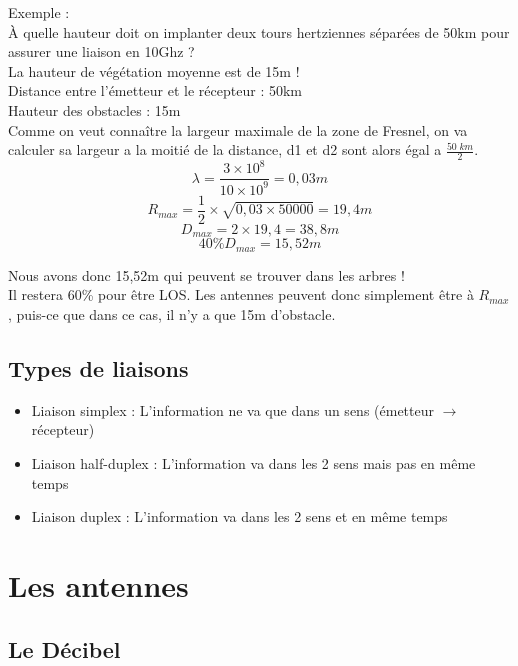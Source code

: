 \documentclass[a4paper]{article}
\begin{document}
Exemple :\\
À quelle hauteur doit on implanter deux tours hertziennes
séparées de 50km pour assurer une liaison en 10Ghz ?\\
La hauteur de végétation moyenne est de 15m !\\
Distance entre l'émetteur et le récepteur : 50km\\
Hauteur des obstacles : 15m\\
Comme on veut connaître la largeur maximale de la zone de Fresnel, on va calculer sa largeur a la moitié de la distance,
d1 et d2 sont alors égal a $\frac{50 \; km}{2}$.\\
$$ \lambda = \frac{3 \times 10^8}{10 \times 10^9} = 0,03m$$
$$ R_{max} = \frac{1}{2} \times \sqrt{0,03 \times 50000} = 19,4m $$
$$ D_{max} = 2 \times 19,4 = 38,8m $$
$$40\% D_{max} = 15,52m$$

Nous avons donc 15,52m qui peuvent se trouver dans les arbres !\\
Il restera 60\% pour être LOS. Les antennes peuvent donc simplement être à $R_{max}$, puis-ce que dans ce cas, il n'y a que 15m d'obstacle.

\subsection{Types de liaisons}
\begin{itemize}
  \item Liaison simplex : L'information ne va que dans un sens (émetteur $\rightarrow$ récepteur)
  \item Liaison half-duplex : L'information va dans les 2 sens mais pas en même temps
  \item Liaison duplex : L'information va dans les 2 sens et en même temps
\end{itemize}

\section{Les antennes}

\subsection{Le Décibel}
\end{document}
